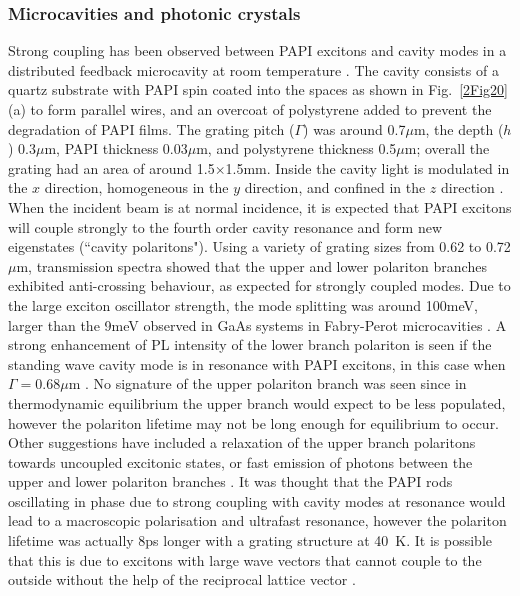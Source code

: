\subsubsection{Microcavities and photonic crystals}
Strong coupling has been observed between PAPI excitons and cavity modes in a distributed feedback microcavity at room temperature \cite{Fujita1998, Fujita1999, Fujita2000}. The cavity consists of a quartz substrate with PAPI spin coated into the spaces as shown in Fig.\ \ref{2Fig20}(a) to form parallel wires, and an overcoat of polystyrene added to prevent the degradation of PAPI films. The grating pitch ($\Gamma$) was around 0.7$\mu$m, the depth ($h$) 0.3$\mu$m, PAPI thickness 0.03$\mu$m, and polystyrene thickness 0.5$\mu$m; overall the grating had an area of around 1.5$\times$1.5mm. Inside the cavity light is modulated in the $x$ direction, homogeneous in the $y$ direction, and confined in the $z$ direction \cite{Fujita1999}. When the incident beam is at normal incidence, it is expected that PAPI excitons will couple strongly to the fourth order cavity resonance and form new eigenstates (``cavity polaritons"). Using a variety of grating sizes from 0.62 to 0.72$\mu$m, transmission spectra showed that the upper and lower polariton branches exhibited anti-crossing behaviour, as expected for strongly coupled modes. Due to the large exciton oscillator strength, the mode splitting was around 100meV, larger than the 9meV observed in GaAs systems in Fabry-Perot microcavities \cite{Fujita1998}. A strong enhancement of PL intensity of the lower branch polariton is seen if the standing wave cavity mode is in resonance with PAPI excitons, in this case when $\Gamma=0.68\mu$m \cite{Fujita1999}. No signature of the upper polariton branch was seen since in thermodynamic equilibrium the upper branch would expect to be less populated, however the polariton lifetime may not be long enough for equilibrium to occur. Other suggestions have included a relaxation of the upper branch polaritons towards uncoupled excitonic states, or fast emission of photons between the upper and lower polariton branches \cite{Lanty2008}. It was thought that the PAPI rods oscillating in phase due to strong coupling with cavity modes at resonance would lead to a macroscopic polarisation and ultrafast resonance, however the polariton lifetime was actually 8ps longer with a grating structure at 40~K. It is possible that this is due to excitons with large wave vectors that cannot couple to the outside without the help of the reciprocal lattice vector \cite{Fujita2000}. 

